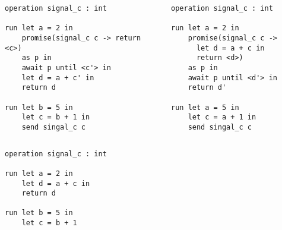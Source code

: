 \documentclass{beamer}
\theoremstyle{definition} %
\theoremstyle{plain} %
\begin{document}
	\begin{frame}[fragile]{\aeff{}}

		\begin{columns}[T]
			\begin{column}{0.49\textwidth}
				\begin{lstlisting}[basicstyle=\tiny]
operation signal_c : int		

run let a = 2 in
    promise(signal_c c -> return <c>)
    as p in
    await p until <c'> in
    let d = a + c' in
    return d 

run let b = 5 in
    let c = b + 1 in
    send singal_c c
				\end{lstlisting}
			\end{column}
		
		
			\begin{column}{0.49\textwidth}
				\begin{lstlisting}[basicstyle=\tiny]
operation signal_c : int		

run let a = 2 in
    promise(signal_c c -> 
      let d = a + c in
      return <d>)
    as p in
    await p until <d'> in
    return d'

run let a = 5 in
    let c = a + 1 in
    send singal_c c
				\end{lstlisting}
			\end{column}
		\end{columns}
	
		
		
		\begin{columns}[T]
			\begin{column}{0.49\textwidth}
				\begin{lstlisting}[basicstyle=\tiny]
operation signal_c : int		

run let a = 2 in
    let d = a + c in
    return d 

run let b = 5 in
    let c = b + 1
				\end{lstlisting}
			\end{column}
			
			
			\begin{column}{0.49\textwidth}
				\begin{lstlisting}[basicstyle=\tiny]

				\end{lstlisting}
			\end{column}
		\end{columns}


		
	\end{frame}
\end{document}
